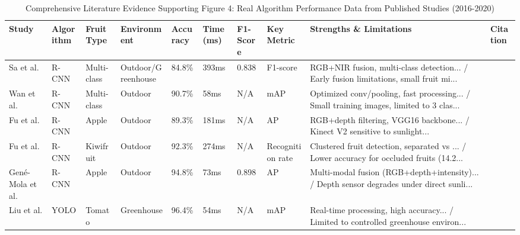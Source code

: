 \begin{table*}[htbp]
\centering
\small
\caption{Comprehensive Literature Evidence Supporting Figure 4: Real Algorithm Performance Data from Published Studies (2016-2020)}
\label{tab:enhanced_figure4_support}
\begin{tabular}{p{}p{}p{}p{}p{}p{}p{}p{}p{}p{}}
\toprule
\textbf{Study} & \textbf{Algorithm} & \textbf{Fruit Type} & \textbf{Environment} & \textbf{Accuracy} & \textbf{Time (ms)} & \textbf{F1-Score} & \textbf{Key Metric} & \textbf{Strengths \& Limitations} & \textbf{Citation} \\ \midrule
Sa et al. & R-CNN & Multi-class & Outdoor/Greenhouse & 84.8\% & 393ms & 0.838 & F1-score & RGB+NIR fusion, multi-class detection... / Early fusion limitations, small fruit mi... & \cite{sa2016deepfruits} \\
Wan et al. & R-CNN & Multi-class & Outdoor & 90.7\% & 58ms & N/A & mAP & Optimized conv/pooling, fast processing... / Small training images, limited to 3 clas... & \cite{wan2020faster} \\
Fu et al. & R-CNN & Apple & Outdoor & 89.3\% & 181ms & N/A & AP & RGB+depth filtering, VGG16 backbone... / Kinect V2 sensitive to sunlight... & \cite{fu2020faster} \\
Fu et al. & R-CNN & Kiwifruit & Outdoor & 92.3\% & 274ms & N/A & Recognition rate & Clustered fruit detection, separated vs ... / Lower accuracy for occluded fruits (14.2... & \cite{fu2018kiwifruit} \\
Gené-Mola et al. & R-CNN & Apple & Outdoor & 94.8\% & 73ms & 0.898 & AP & Multi-modal fusion (RGB+depth+intensity)... / Depth sensor degrades under direct sunli... & \cite{gene2019multi} \\
Liu et al. & YOLO & Tomato & Greenhouse & 96.4\% & 54ms & N/A & mAP & Real-time processing, high accuracy... / Limited to controlled greenhouse environ... & \cite{liu2020yolo} \\
\bottomrule
\end{tabular}
\end{table*}

